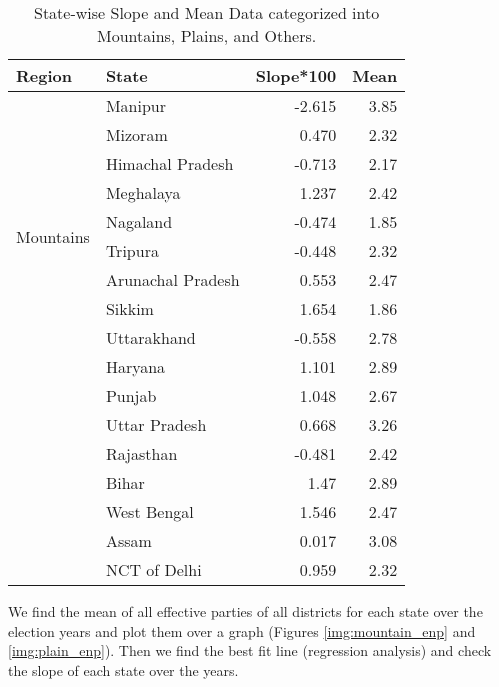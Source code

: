 \begin{table}[h!]
\centering
\begin{tabular}{|l|l|r|r|}
\hline
\textbf{Region} & \textbf{State} & \textbf{Slope*100} & \textbf{Mean} \\ \hline
\multirow{10}{*}{Mountains} & Manipur & -2.615 & 3.85 \\ \cline{2-4}
& Mizoram & 0.470 & 2.32 \\ \cline{2-4}
& Himachal Pradesh & -0.713 & 2.17 \\ \cline{2-4}
& Meghalaya & 1.237 & 2.42 \\ \cline{2-4}
& Nagaland & -0.474 & 1.85 \\ \cline{2-4}
& Tripura & -0.448 & 2.32 \\ \cline{2-4}
& Arunachal Pradesh & 0.553 & 2.47 \\ \cline{2-4}
& Sikkim & 1.654 & 1.86 \\ \cline{2-4}
& Uttarakhand & -0.558 & 2.78 \\ \hline
\multirow{8}{*}{Plains} & Haryana & 1.101 & 2.89 \\ \cline{2-4}
& Punjab & 1.048 & 2.67 \\ \cline{2-4}
& Uttar Pradesh & 0.668 & 3.26 \\ \cline{2-4}
& Rajasthan & -0.481 & 2.42 \\ \cline{2-4}
& Bihar & 1.47 & 2.89 \\ \cline{2-4}
& West Bengal & 1.546 & 2.47 \\ \cline{2-4}
& Assam & 0.017 & 3.08 \\ \cline{2-4}
& NCT of Delhi & 0.959 & 2.32 \\ \hline
\end{tabular}
\caption{State-wise Slope and Mean Data categorized into Mountains, Plains, and Others.}
\label{tab:state_data}
\end{table}
\vspace{0.3cm} 
We find the mean of all effective parties of all districts for each state over the election years and plot them over a graph (Figures \ref{img:mountain_enp} and \ref{img:plain_enp}). Then we find the best fit line (regression analysis) and check the slope of each state over the years.

    \label{img:mountain_enp}


